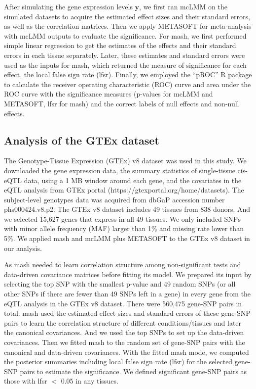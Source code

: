         After simulating the gene expression levels $\mathbf{y}$, we first ran mcLMM on the simulated datasets to acquire the estimated effect sizes and their standard errors, as well as the correlation matrices. Then we apply METASOFT for meta-analysis with mcLMM outputs to evaluate the significance. For mash, we first performed simple linear regression to get the estimates of the effects and their standard errors in each tissue separately. Later, these estimates and standard errors were used as the inputs for mash, which returned the measure of significance for each effect, the local false sign rate (lfsr). Finally, we employed the ``pROC'' R package \cite{Robin2011-ww} to calculate the receiver operating characteristic (ROC) curve and area under the ROC curve with the significance measures (p-values for mcLMM and METASOFT, lfsr for mash) and the correct labels of null effects and non-null effects.
    
    \subsection{Analysis of the GTEx dataset}
        The Genotype-Tissue Expression (GTEx) v8 dataset \cite{GTEx_Consortium2020-xx} was used in this study. We downloaded the gene expression data, the summary statistics of single-tissue cis-eQTL data, using a 1 MB window around each gene, and the covariates in the eQTL analysis from GTEx portal (https://gtexportal.org/home/datasets). The subject-level genotypes data was acquired from dbGaP accession number phs000424.v8.p2. The GTEx v8 dataset includes 49 tissues from 838 donors. And we selected 15,627 genes that express in all 49 tissues. We only included SNPs with minor allele frequency (MAF) larger than 1\% and missing rate lower than 5\%. We applied mash and mcLMM plus METASOFT to the GTEx v8 dataset in our analysis. 
        
        As mash needed to learn correlation structure among non-significant tests and data-driven covariance matrices before fitting its model. We prepared its input by selecting the top SNP with the smallest p-value and 49 random SNPs (or all other SNPs if there are fewer than 49 SNPs left in a gene) in every gene from the eQTL analysis in the GTEx v8 dataset. There were 560,475 gene-SNP pairs in total. mash used the estimated effect sizes and standard errors of these gene-SNP pairs to learn the correlation structure of different conditions/tissues and later the canonical covariances. And we used the top SNPs to set up the data-driven covariances. Then we fitted mash to the random set of gene-SNP pairs with the canonical and data-driven covariances. With the fitted mash mode, we computed the posterior summaries including local false sign rate (lfsr) \cite{stephens2017false} for the selected gene-SNP pairs to estimate the significance. We defined significant gene-SNP pairs as those with lfsr $<$ 0.05 in any tissues. 
        
